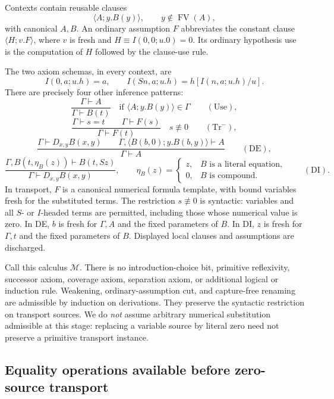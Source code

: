 Contexts contain reusable clauses
\[
       \langle A;y.B(y)\rangle,
       \qquad y\notin\operatorname{FV}(A),
\]
with canonical $A,B$. An ordinary assumption $F$ abbreviates the constant
clause $\langle H;v.F\rangle$, where $v$ is fresh and
$H\equiv I(0,0;u.0)=0$. Its ordinary hypothesis use is the computation
of $H$ followed by the clause-use rule.

The two axiom schemas, in every context, are
\[
 I(0,a;u.h)=a,
 \qquad
 I(Sn,a;u.h)=h[I(n,a;u.h)/u].
 \tag{I0,IS}\label{mir:computation}
\]
There are precisely four other inference patterns:
\[
 \frac{\Gamma\vdash A}{\Gamma\vdash B(t)}
 \quad\text{if }\langle A;y.B(y)\rangle\in\Gamma
 \qquad(\mathrm{Use}),
\]
\[
 \frac{\Gamma\vdash s=t\qquad\Gamma\vdash F(s)}
      {\Gamma\vdash F(t)}
 \quad s\not\equiv0
 \qquad(\mathrm{Tr}^{-}),
 \tag{Restricted transport}\label{mir:transport}
\]
\[
 \frac{\Gamma\vdash D_{x,y}B(x,y)\qquad
       \Gamma,\langle B(b,0);y.B(b,y)\rangle\vdash A}
      {\Gamma\vdash A}\qquad(\mathrm{DE}),
\]
\[
 \frac{\Gamma,B(t,\eta_B(z))\vdash B(t,Sz)}
      {\Gamma\vdash D_{x,y}B(x,y)},
 \qquad
 \eta_B(z)=
 \begin{cases}
   z,&B\text{ is a literal equation},\\
   0,&B\text{ is compound}.
 \end{cases}
 \qquad(\mathrm{DI}).
 \tag{Root-determined introduction}\label{mir:introduction}
\]
In transport, $F$ is a canonical numerical formula template, with bound
variables fresh for the substituted terms. The restriction $s\not\equiv0$
is syntactic: variables and all $S$- or $I$-headed terms are permitted,
including those whose numerical value is zero. In DE, $b$ is fresh for
$\Gamma,A$ and the fixed parameters of $B$. In DI, $z$ is fresh for
$\Gamma,t$ and the fixed parameters of $B$. Displayed local clauses and
assumptions are discharged.

Call this calculus $\mathcal M$. There is no introduction-choice bit,
primitive reflexivity, successor axiom, coverage axiom, separation axiom,
or additional logical or induction rule. Weakening, ordinary-assumption
cut, and capture-free renaming are admissible by induction on derivations.
They preserve the syntactic restriction on transport sources. We do
\emph{not} assume arbitrary numerical substitution admissible at this
stage: replacing a variable source by literal zero need not preserve a
primitive transport instance.

\subsection{Equality operations available before zero-source transport}

